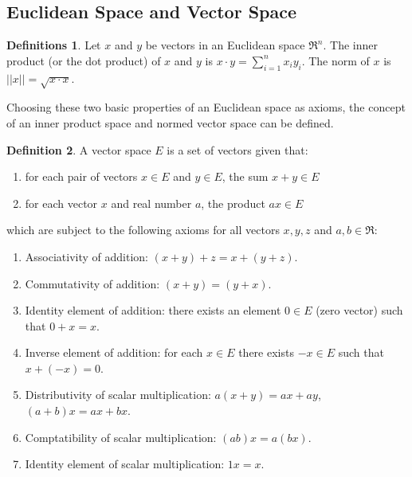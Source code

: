 \documentclass[12pt,a4paper]{article}
\theoremstyle{definition}
\newtheorem{defn}{Definition}[section]
\newtheorem{defns}[defn]{Definitions}
\begin{document}
\subsection{Euclidean Space and Vector Space}
\begin{defns}
Let $x$ and $y$ be vectors in an Euclidean space $\Re^n$. The inner product (or
the dot product) of $x$ and $y$ is $x \cdot y = \sum^n_{i=1} x_i y_i$. The norm
of $x$ is $ ||x|| = \sqrt{x \cdot x}$.
\end{defns}
Choosing these two basic properties of an Euclidean space as axioms, the
concept of an inner product space and normed vector space can be defined.
\begin{defn}
A vector space $E$ is a set of vectors given that:
\begin{enumerate}
\item for each pair of vectors $x \in E$ and $y \in E$, the sum $x + y \in E$
\item for each vector $x$ and real number $a$, the product $a x \in E$
\end{enumerate}
which are subject to the following axioms for all vectors $x, y, z$ and $a, b
\in \Re$:
\begin{enumerate}
\item Associativity of addition: $(x + y) + z = x + (y + z)$.
\item Commutativity of addition: $(x + y) = (y + x)$.
\item Identity element of addition: there exists an element $0 \in E$ (zero
vector) such that $0 + x = x$.
\item Inverse element of addition: for each $x \in E$ there exists $-x \in E$
such that $x + (-x) = 0$.
\item Distributivity of scalar multiplication: $a (x + y) = ax + ay$, $(a + b)x
= ax + bx$.
\item Comptatibility of scalar multiplication: $(ab)x = a(bx)$.
\item Identity element of scalar multiplication: $1 x = x$.
\end{enumerate}
\end{defn}
\end{document}
